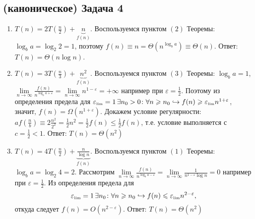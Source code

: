 \documentclass[a4paper]{article}
\def\eps{\varepsilon}
\begin{document}
\subsection*{(каноническое) Задача 4}
\begin{enumerate}
\item $T(n)=2T(\frac{n}{2})+\underbrace{n}_{f(n)}$. Воспользуемся пунктом $(2)$ Теоремы: $\log_b a=\log_2 2=1$, поэтому $f(n)\equiv n=\Theta(n^{\log_b a})\equiv\Theta(n)$.\newline
Ответ: $\boxed{T(n)=\Theta(n\log n)}$.
\item $T(n)=3T(\frac{n}{3})+\underbrace{n^2}_{f(n)}$. Воспользуемся пунктом $(3)$ Теоремы: $\log_b a=1$, $\lim\limits_{n\to\infty}\frac{f(n)}{n^{\log_b a+\eps}}=\lim\limits_{n\to\infty}n^{1-\eps}=+\infty$ например при $\eps=\frac{1}{2}$. Поэтому из определения предела для $\eps_{\mbox{\tiny lim}}=1\,\exists n_0>0\colon\forall n\geqslant n_0\hookrightarrow f(n)\geqslant \eps_{\mbox{\tiny lim}} n^{1+\eps}$, значит, $f(n)=\Omega(n^{1+\eps})$. Докажем условие регулярности: $af(\frac{n}{b})\equiv 2\frac{n^2}{2^2}=\frac{1}{2}n^2=\frac{1}{2}f(n)\leqslant\frac{1}{2}f(n)$, т.е. условие выполняется с $c=\frac{1}{2}<1$.\newline
Ответ: $\boxed{T(n)=\Theta(n^2)}$
\item $T(n)=4T(\frac{n}{2})+\underbrace{\frac{n}{\log n}}_{f(n)}$. Воспользуемся пунктом $(1)$ Теоремы: $\log_b a=\log_2 4=2$.\newline
Рассмотрим $\lim\limits_{n\to\infty}\frac{f(n)}{n^{\log_b a-\eps}}=\lim\limits_{n\to\infty}\frac{1}{n^{1-\eps}\log n}=0$ например при $\eps=\frac{1}{2}$. Из определения предела для $$\eps_{\mbox{\tiny lim}}=1\,\exists n_0\colon\forall n\geqslant n_0\hookrightarrow f(n)\leqslant \eps_{\mbox{\tiny lim}} n^{2-\eps},$$ откуда следует $f(n)=O(n^{2-\eps})$.\newline
Ответ: $\boxed{T(n)=\Theta(n^2)}$
\end{enumerate}
\end{document}
